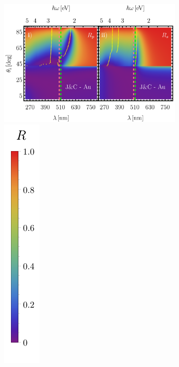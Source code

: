 	\begin{figure}[h!]\centering
	\begin{subfigure}{.01\linewidth}\caption{}\label{sfig:JCAu}\vspace{3cm}\end{subfigure}\hspace*{-1em}
	\begin{subfigure}{.45\linewidth}\includegraphics[width = .95\linewidth,]{2-Resultados/figs/5-JCAu/0-2D_Grid.png}\includegraphics[scale=.6, trim={00 00 00 00}, clip]{2-Resultados/figs/0-RBar_v}
	\end{subfigure}\hspace*{1em}

\end{figure}
